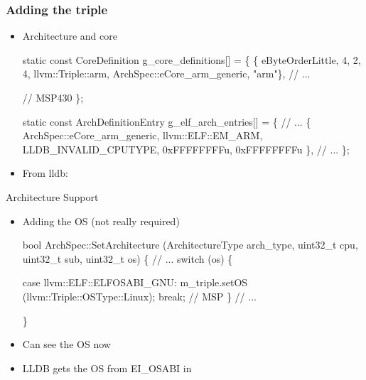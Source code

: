 \begin{frame}[fragile]
\frametitle{Adding the triple}
\begin{itemize}
\item Architecture and core
\begin{codebox2}
static const CoreDefinition g_core_definitions[] =
\{
    \{ eByteOrderLittle, 4, 2, 4, llvm::Triple::arm, ArchSpec::eCore_arm_generic, "arm"\},
    // ...

    // MSP430
\};

static const ArchDefinitionEntry g_elf_arch_entries[] =
\{
    // ...
    \{ ArchSpec::eCore_arm_generic, llvm::ELF::EM_ARM, LLDB_INVALID_CPUTYPE, 0xFFFFFFFFu, 0xFFFFFFFFu \},
    // ...
\};

\end{codebox2}

\item From lldb:
\end{itemize}
\end{frame}

\begin{frame}[fragile]
{Architecture Support}
\begin{itemize}
\item Adding the OS (not really required)
\begin{codebox2}
bool
ArchSpec::SetArchitecture (ArchitectureType arch_type, uint32_t cpu, uint32_t sub, uint32_t os)
\{
    // ...
    switch (os)
    \{

        case llvm::ELF::ELFOSABI_GNU:     m_triple.setOS (llvm::Triple::OSType::Linux);   break;
        // MSP
    \}
    // ...
               
\}
\end{codebox2}

\item Can see the OS now
\item LLDB gets the OS from EI\_OSABI in 
\end{itemize}
\end{frame}

